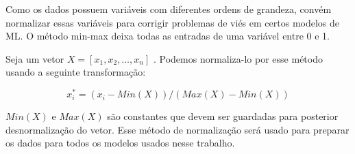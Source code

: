 Como os dados possuem variáveis com diferentes ordens de grandeza, convém
normalizar essas variáveis para corrigir problemas de viés em certos modelos de
ML. O método min-max deixa todas as entradas de uma variável entre 0 e 1.

Seja um vetor $X =[x_1,x_2,\dots,x_n]$ . Podemos normaliza-lo por esse método usando a
seguinte transformação:

\[
  x^*_{i} = ( x_i - Min(X))/(Max(X) - Min(X)) 
\]

$Min(X)$  e $Max(X)$ são constantes que devem ser guardadas para posterior
desnormalização do vetor. Esse método de normalização será usado para preparar
os dados para todos os modelos usados nesse trabalho.



